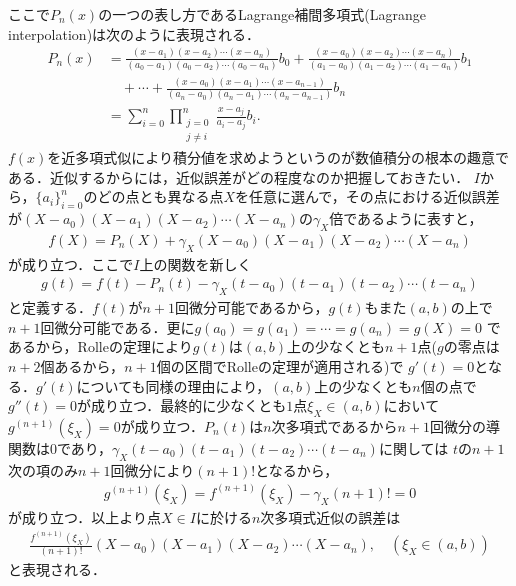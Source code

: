 \documentclass[a4j,papersize,disablejfam,slide,14pt]{jsarticle}
\begin{document}
    ここで$P_n(x)$の一つの表し方である{\rm Lagrange}補間多項式({\rm Lagrange interpolation})は次のように表現される．
    \begin{align}
    	P_n(x) &= \frac{(x-a_1)(x-a_2)\cdots(x-a_n)}{(a_0-a_1)(a_0-a_2)\cdots(a_0-a_n)}b_0 + \frac{(x-a_0)(x-a_2)\cdots(x-a_n)}{(a_1-a_0)(a_1-a_2)\cdots(a_1-a_n)}b_1 \\
        &\quad + \cdots + \frac{(x-a_0)(x-a_1)\cdots(x-a_{n-1})}{(a_n-a_0)(a_n-a_1)\cdots(a_n-a_{n-1})}b_n\\
        &= \sum_{i=0}^{n} \prod_{\substack{j=0\\j \neq i}}^{n} \frac{x-a_j}{a_i - a_j} b_i.
    \end{align}
    $f(x)$を近多項式似により積分値を求めようというのが数値積分の根本の趣意である．近似するからには，近似誤差がどの程度なのか把握しておきたい．
    $I$から，$\{a_i\}_{i=0}^{n}$のどの点とも異なる点$X$を任意に選んで，その点における近似誤差が$(X-a_0)(X-a_1)(X-a_2)\cdots(X-a_n)$の$\gamma_X$倍であるように表すと，
    \begin{align}
    	f(X) = P_n(X) + \gamma_X(X-a_0)(X-a_1)(X-a_2)\cdots(X-a_n)
    \end{align}
    が成り立つ．ここで$I$上の関数を新しく
    \begin{align}
    	g(t) = f(t) - P_n(t) - \gamma_X(t-a_0)(t-a_1)(t-a_2)\cdots(t-a_n)
    \end{align}
    と定義する．$f(t)$が$n+1$回微分可能であるから，$g(t)$もまた$(a,b)$の上で$n+1$回微分可能である．更に$g(a_0) = g(a_1) = \cdots = g(a_n) = g(X) = 0$
    であるから，{\rm Rolle}の定理により$g(t)$は$(a,b)$上の少なくとも$n+1$点($g$の零点は$n+2$個あるから，$n+1$個の区間で{\rm Rolle}の定理が適用される)で
    $g'(t) = 0$となる．$g'(t)$についても同様の理由により，$(a,b)$上の少なくとも$n$個の点で$g''(t)=0$が成り立つ．最終的に少なくとも$1$点$\xi_X \in (a,b)$において
    $g^{(n+1)}(\xi_X)=0$が成り立つ．$P_n(t)$は$n$次多項式であるから$n+1$回微分の導関数は$0$であり，$\gamma_X(t-a_0)(t-a_1)(t-a_2)\cdots(t-a_n)$に関しては
    $t$の$n+1$次の項のみ$n+1$回微分により$(n+1)!$となるから，
    \begin{align}
    	g^{(n+1)}(\xi_X) = f^{(n+1)}(\xi_X) - \gamma_X(n+1)! = 0
    \end{align}
    が成り立つ．以上より点$X \in I$に於ける$n$次多項式近似の誤差は
    \begin{align}
    	\frac{f^{(n+1)}(\xi_X)}{(n+1)!}(X-a_0)(X-a_1)(X-a_2)\cdots(X-a_n), \quad (\xi_X \in (a,b))
    \end{align}
    と表現される．
\end{document}

